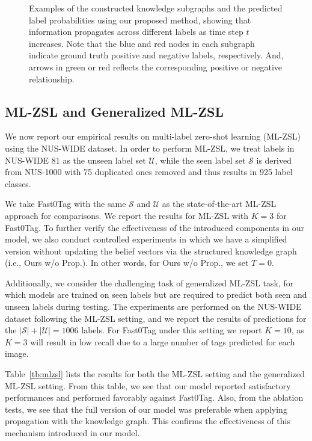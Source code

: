\documentclass[10pt,twocolumn,letterpaper]{article}
\begin{document}
\begin{figure*}[t]
\begin{minipage}{.22\linewidth}
  \end{minipage}
\caption{Examples of the constructed knowledge subgraphs and the predicted label probabilities using our proposed method, showing that information propagates across different labels as time step $t$ increases. Note that the blue and red nodes in each subgraph indicate ground truth positive and negative labels, respectively. And, arrows in green or red reflects the corresponding positive or negative relationship.}
\label{fig:fig5}
\end{figure*}\subsection{ML-ZSL and Generalized ML-ZSL}
We now report our empirical results on multi-label zero-shot learning (ML-ZSL) using the NUS-WIDE dataset. 
In order to perform ML-ZSL, we treat labels in NUS-WIDE 81 as the unseen label set $\mathcal{U}$, while the seen label set $\mathcal{S}$ is derived from NUS-1000 with 75 duplicated ones removed and thus results in 925 label classes.

We take Fast0Tag \cite{Zhang_2016_CVPR} with the same $\mathcal{S}$ and $\mathcal{U}$ as the state-of-the-art ML-ZSL approach for comparisons. We report the results for ML-ZSL with $K=3$ for Fast0Tag. To further verify the effectiveness of the introduced components in our model, we also conduct controlled experiments in which we have a simplified version without updating the belief vectors via the structured knowledge graph (i.e., Ours w/o Prop.). 
In other words, for Ours w/o Prop., we set $T=0$.

Additionally, we consider the challenging task of generalized ML-ZSL task, for which models are trained on seen labels but are required to predict both seen and unseen labels during testing. The experiments are performed on the NUS-WIDE dataset following the ML-ZSL setting, and we report the results of predictions for the $|\mathcal{S}|+|\mathcal{U}|=1006$ labels. 
For Fast0Tag under this setting we report $K=10$, as $K=3$ will result in low recall due to a large number of tags predicted for each image. 

Table~\ref{tb:mlzsl} lists the results for both the ML-ZSL setting and the generalized ML-ZSL setting. 
From this table, we see that our model reported satisfactory performances and performed favorably against Fast0Tag. Also, from the ablation tests, we see that the full version of our model was preferable when applying propagation with the knowledge graph. This confirms the effectiveness of this mechanism introduced in our model.
\end{document}
